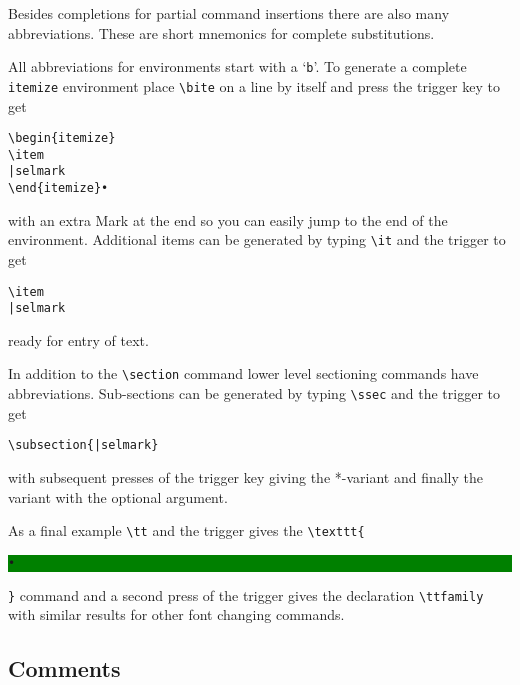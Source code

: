 \documentclass[11pt]{article}
\newcommand{\cmd}[1]{\texttt{#1}}
\newcommand{\selmark}{\colorbox{green}{\rule[-0.5ex]{0ex}{2.1ex}\texttt{•}}}
\begin{document}
Besides completions for partial command insertions there are also many abbreviations. These are short mnemonics for complete substitutions. 

All abbreviations for environments start with a `\texttt{b}'. To generate a complete \cmd{itemize} environment place \verb|\bite| on a line by itself and press the trigger key to get
\begin{verbatim}
\begin{itemize}
\item
|selmark
\end{itemize}•
\end{verbatim}
with an extra Mark at the end so you can easily jump to the end of the environment. Additional items can be generated by typing \verb|\it| and the trigger to get
\begin{verbatim}
\item
|selmark
\end{verbatim}
ready for entry of text.

In addition to the \verb|\section| command lower level sectioning commands have abbreviations. Sub-sections can be generated by typing \verb|\ssec| and the trigger to get
\begin{verbatim}
\subsection{|selmark}
\end{verbatim}
with subsequent presses of the trigger key giving the *-variant and finally the variant with the optional argument.

As a final example \verb|\tt| and the trigger gives the \verb|\texttt{|\selmark\verb|}| command and a second press of the trigger gives the declaration \verb|\ttfamily| with similar results for other font changing commands.

\subsection*{Comments}
\end{document}
